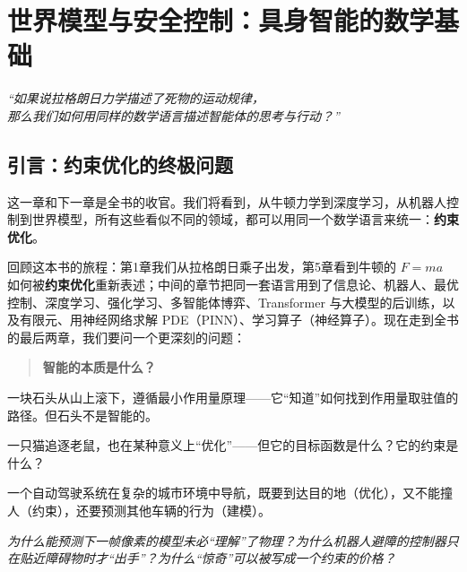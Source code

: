\chapter{世界模型与安全控制：具身智能的数学基础}

\vspace{1cm}
\begin{center}
\textit{“如果说拉格朗日力学描述了死物的运动规律，\\
那么我们如何用同样的数学语言描述智能体的思考与行动？”}
\end{center}
\vspace{1cm}

\section*{引言：约束优化的终极问题}

这一章和下一章是全书的收官。我们将看到，从牛顿力学到深度学习，从机器人控制到世界模型，所有这些看似不同的领域，都可以用同一个数学语言来统一：\textbf{约束优化}。

回顾这本书的旅程：第1章我们从拉格朗日乘子出发，第5章看到牛顿的 $F = ma$ 如何被\textbf{约束优化}重新表述；中间的章节把同一套语言用到了信息论、机器人、最优控制、深度学习、强化学习、多智能体博弈、Transformer 与大模型的后训练，以及有限元、用神经网络求解 PDE（PINN）、学习算子（神经算子）。现在走到全书的最后两章，我们要问一个更深刻的问题：

\begin{quote}
\textbf{智能的本质是什么？}
\end{quote}

一块石头从山上滚下，遵循最小作用量原理——它“知道”如何找到作用量取驻值的路径。但石头不是智能的。

一只猫追逐老鼠，也在某种意义上“优化”——但它的目标函数是什么？它的约束是什么？

一个自动驾驶系统在复杂的城市环境中导航，既要到达目的地（优化），又不能撞人（约束），还要预测其他车辆的行为（建模）。

\vspace{0.3cm}
\noindent\textit{为什么能预测下一帧像素的模型未必“理解”了物理？为什么机器人避障的控制器只在贴近障碍物时才“出手”？为什么“惊奇”可以被写成一个约束的价格？}

